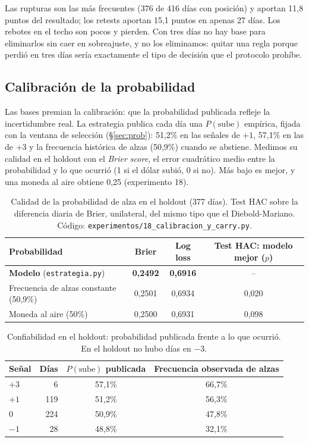 \documentclass[10pt,a4paper]{article}
\newcommand{\ruta}[1]{\nolinkurl{#1}}
\begin{document}
Las rupturas son las más frecuentes (376 de 416 días con posición) y aportan 11,8
puntos del resultado; los retests aportan 15,1 puntos en apenas 27 días. Los rebotes en
el techo son pocos y pierden. Con tres días no hay base para eliminarlos sin caer en
sobreajuste, y no los eliminamos: quitar una regla porque perdió en tres días sería
exactamente el tipo de decisión que el protocolo prohíbe.

\subsection{Calibración de la probabilidad}\label{sec:calibracion}

Las bases premian la calibración: que la probabilidad publicada refleje la
incertidumbre real. La estrategia publica cada día una $P(\text{sube})$ empírica,
fijada con la ventana de selección (§\ref{sec:prob}): 51,2\% en las señales de $+1$,
57,1\% en las de $+3$ y la frecuencia histórica de alzas (50,9\%) cuando se abstiene.
Medimos su calidad en el holdout con el \emph{Brier score}, el error cuadrático medio
entre la probabilidad y lo que ocurrió (1 si el dólar subió, 0 si no). Más bajo es
mejor, y una moneda al aire obtiene 0,25 (experimento 18).

\begin{table}[htb]\centering\small
\begin{tabular}{@{}lccc@{}}
\toprule
Probabilidad & Brier & Log loss & Test HAC: modelo mejor ($p$) \\
\midrule
\textbf{Modelo} (\texttt{estrategia.py}) & \textbf{0,2492} & \textbf{0,6916} & -- \\
Frecuencia de alzas constante (50,9\%) & 0,2501 & 0,6934 & 0,020 \\
Moneda al aire (50\%)                  & 0,2500 & 0,6931 & 0,098 \\
\bottomrule
\end{tabular}
\caption{Calidad de la probabilidad de alza en el holdout (377 días). Test HAC sobre la
diferencia diaria de Brier, unilateral, del mismo tipo que el Diebold-Mariano. Código:
\ruta{experimentos/18_calibracion_y_carry.py}.}\label{tab:brier}
\end{table}

\begin{table}[htb]\centering\small
\begin{tabular}{@{}lrcc@{}}
\toprule
Señal & Días & $P(\text{sube})$ publicada & Frecuencia observada de alzas \\
\midrule
$+3$ & 6   & 57,1\% & 66,7\% \\
$+1$ & 119 & 51,2\% & 56,3\% \\
0    & 224 & 50,9\% & 47,8\% \\
$-1$ & 28  & 48,8\% & 32,1\% \\
\bottomrule
\end{tabular}
\caption{Confiabilidad en el holdout: probabilidad publicada frente a lo que ocurrió.
En el holdout no hubo días en $-3$.}\label{tab:confiabilidad}
\end{table}
\end{document}
